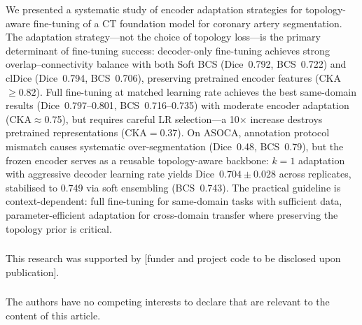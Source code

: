 \documentclass[runningheads]{llncs}
\begin{document}
We presented a systematic study of encoder adaptation strategies for topology-aware fine-tuning of a CT foundation model for coronary artery segmentation.
The adaptation strategy---not the choice of topology loss---is the primary determinant of fine-tuning success: decoder-only fine-tuning achieves strong overlap--connectivity balance with both Soft BCS (Dice~0.792, BCS~0.722) and clDice (Dice~0.794, BCS~0.706), preserving pretrained encoder features (CKA${\geq}0.82$).
Full fine-tuning at matched learning rate achieves the best same-domain results (Dice~0.797--0.801, BCS~0.716--0.735) with moderate encoder adaptation (CKA${\approx}$0.75), but requires careful LR selection---a 10$\times$ increase destroys pretrained representations (CKA${=}$0.37).
On ASOCA, annotation protocol mismatch causes systematic over-segmentation (Dice~0.48, BCS~0.79), but the frozen encoder serves as a reusable topology-aware backbone: $k{=}1$ adaptation with aggressive decoder learning rate yields Dice~$0.704{\pm}0.028$ across replicates, stabilised to 0.749 via soft ensembling (BCS~0.743).
The practical guideline is context-dependent: full fine-tuning for same-domain tasks with sufficient data, parameter-efficient adaptation for cross-domain transfer where preserving the topology prior is critical.

\begin{credits}
\subsubsection{\ackname}
This research was supported by [funder and project code to be disclosed upon publication].

\subsubsection{\discintname}
The authors have no competing interests to declare that are relevant to the content of this article.
\end{credits}



\end{document}
